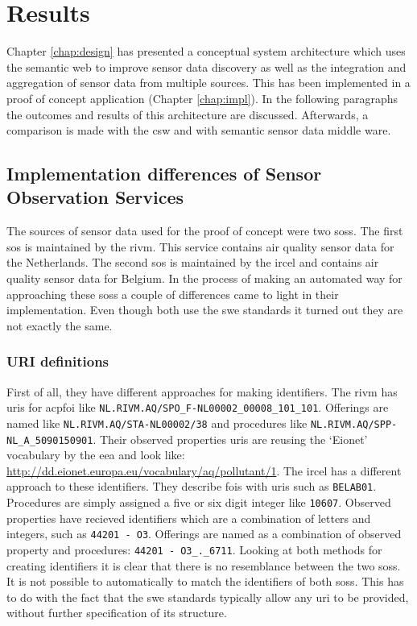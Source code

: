 

\chapter{Results}
\label{chap:results}

Chapter \ref{chap:design} has presented a conceptual system architecture which uses the semantic web to improve sensor data discovery as well as the integration and aggregation of sensor data from multiple sources. This has been implemented in a proof of concept application (Chapter \ref{chap:impl}). In the following paragraphs the outcomes and results of this architecture are discussed. Afterwards, a comparison is made with the \acf{csw} and with semantic sensor data middle ware. 

\section{Implementation differences of Sensor Observation Services}
\label{par:differences}
The sources of sensor data used for the proof of concept were two \aclp{sos}. The first \ac{sos} is maintained by the \acf{rivm}. This service contains air quality sensor data for the Netherlands. The second \ac{sos} is maintained by the \ac{ircel} and contains air quality sensor data for Belgium. In the process of making an automated way for approaching these \aclp{sos} a couple of differences came to light in their implementation. Even though both use the \ac{swe} standards it turned out they are not exactly the same. 

\subsection{URI definitions}
\begin{sloppypar}
	First of all, they have different approaches for making identifiers. The \ac{rivm} has \acp{uri} for acp{foi} like \texttt{NL.RIVM.AQ/SPO\_F-NL00002\_00008\_101\_101}. Offerings are named like \texttt{NL.RIVM.AQ/STA-NL00002/38} and procedures like \texttt{NL.RIVM.AQ/SPP-NL\_A\_5090150901}. Their observed properties \acp{uri} are reusing the `Eionet' vocabulary by the \ac{eea} and look like: \url{http://dd.eionet.europa.eu/vocabulary/aq/pollutant/1}. The \ac{ircel} has a different approach to these identifiers. They describe \acp{foi} with \acp{uri} such as \texttt{BELAB01}. Procedures are simply assigned a five or six digit integer like \texttt{10607}. Observed properties have recieved identifiers which are a combination of letters and integers, such as \texttt{44201 - O3}. Offerings are named as a combination of observed property and procedures: \texttt{44201 - O3\_.\_6711}. Looking at both methods for creating identifiers it is clear that there is no resemblance between the two \aclp{sos}. It is not possible to automatically to match the identifiers of both \aclp{sos}. This has to do with the fact that the \ac{swe} standards typically allow  any \ac{uri} to be provided, without further specification of its structure. 
\end{sloppypar}

